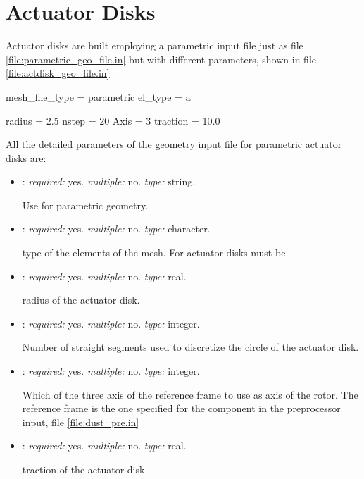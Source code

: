 \section{Actuator Disks}
\label{sec:ActuatorDisks}
Actuator disks are built employing a parametric input file just as file \ref{file:parametric_geo_file.in} but with different parameters, shown in file \ref{file:actdisk_geo_file.in} 

\begin{inputfile}[frame=single, caption={actdisk\_geo\_file.in}, label={file:actdisk_geo_file.in}]
mesh_file_type = parametric
el_type = a

radius = 2.5
nstep = 20
Axis = 3
traction = 10.0
\end{inputfile}


All the detailed parameters of the geometry input file for parametric actuator disks are:
\begin{itemize}
\item {}: \textit{required:} yes. \textit{multiple:} no. \textit{type:} string. 

Use  for parametric geometry.

\item {}: \textit{required:} yes. \textit{multiple:} no. \textit{type:} character.

type of the elements of the mesh. For actuator disks must be 

\item {}: \textit{required:} yes. \textit{multiple:} no. \textit{type:} real.

radius of the actuator disk.

\item {}: \textit{required:} yes. \textit{multiple:} no. \textit{type:} integer.

Number of straight segments used to discretize the circle of the actuator disk.

\item {}: \textit{required:} yes. \textit{multiple:} no. \textit{type:} integer.

Which of the three axis of the reference frame to use as axis of the rotor. The reference frame is the one specified for the component in the preprocessor input, file \ref{file:dust_pre.in}

\item {}: \textit{required:} yes. \textit{multiple:} no. \textit{type:} real.

traction of the actuator disk.
\end{itemize}




